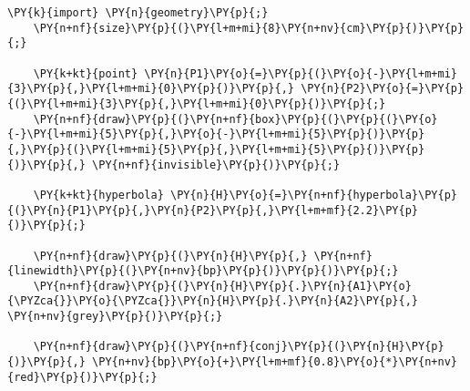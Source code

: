 \begin{Verbatim}[commandchars=\\\{\}]
    \PY{k}{import} \PY{n}{geometry}\PY{p}{;}
    \PY{n+nf}{size}\PY{p}{(}\PY{l+m+mi}{8}\PY{n+nv}{cm}\PY{p}{)}\PY{p}{;}

    \PY{k+kt}{point} \PY{n}{P1}\PY{o}{=}\PY{p}{(}\PY{o}{-}\PY{l+m+mi}{3}\PY{p}{,}\PY{l+m+mi}{0}\PY{p}{)}\PY{p}{,} \PY{n}{P2}\PY{o}{=}\PY{p}{(}\PY{l+m+mi}{3}\PY{p}{,}\PY{l+m+mi}{0}\PY{p}{)}\PY{p}{;}
    \PY{n+nf}{draw}\PY{p}{(}\PY{n+nf}{box}\PY{p}{(}\PY{p}{(}\PY{o}{-}\PY{l+m+mi}{5}\PY{p}{,}\PY{o}{-}\PY{l+m+mi}{5}\PY{p}{)}\PY{p}{,}\PY{p}{(}\PY{l+m+mi}{5}\PY{p}{,}\PY{l+m+mi}{5}\PY{p}{)}\PY{p}{)}\PY{p}{,} \PY{n+nf}{invisible}\PY{p}{)}\PY{p}{;}

    \PY{k+kt}{hyperbola} \PY{n}{H}\PY{o}{=}\PY{n+nf}{hyperbola}\PY{p}{(}\PY{n}{P1}\PY{p}{,}\PY{n}{P2}\PY{p}{,}\PY{l+m+mf}{2.2}\PY{p}{)}\PY{p}{;}

    \PY{n+nf}{draw}\PY{p}{(}\PY{n}{H}\PY{p}{,} \PY{n+nf}{linewidth}\PY{p}{(}\PY{n+nv}{bp}\PY{p}{)}\PY{p}{)}\PY{p}{;}
    \PY{n+nf}{draw}\PY{p}{(}\PY{n}{H}\PY{p}{.}\PY{n}{A1}\PY{o}{\PYZca{}}\PY{o}{\PYZca{}}\PY{n}{H}\PY{p}{.}\PY{n}{A2}\PY{p}{,} \PY{n+nv}{grey}\PY{p}{)}\PY{p}{;}

    \PY{n+nf}{draw}\PY{p}{(}\PY{n+nf}{conj}\PY{p}{(}\PY{n}{H}\PY{p}{)}\PY{p}{,} \PY{n+nv}{bp}\PY{o}{+}\PY{l+m+mf}{0.8}\PY{o}{*}\PY{n+nv}{red}\PY{p}{)}\PY{p}{;}
\end{Verbatim}
